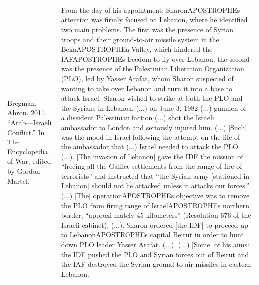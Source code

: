 {\begin{longtable}{p{}p{}}
\\
Bregman, Ahron. 2011. “Arab—Israeli Conflict.” In The Encyclopedia of War, edited by Gordon Martel. & From the day of his appointment, SharonAPOSTROPHEs attention was firmly focused on Lebanon, where he identified two main problems. The first was the presence of Syrian troops and their ground-to-air missile system in the BekaAPOSTROPHEa Valley, which hindered the IAFAPOSTROPHEs freedom to fly over Lebanon; the second was the presence of the Palestinian Liberation Organization (PLO), led by Yasser Arafat, whom Sharon suspected of wanting to take over Lebanon and turn it into a base to attack Israel. Sharon wished to strike at both the PLO and the Syrians in Lebanon. (...) on June 3, 1982 (...) gunmen of a dissident Palestinian faction (...) shot the Israeli ambassador to London and seriously injured him. (...) [Such] was the mood in Israel following the attempt on the life of the ambassador that (...) Israel needed to attack the PLO. (...).
[The invasion of Lebanon] gave the IDF the mission of “freeing all the Galilee settlements from the range of fire of terrorists” and instructed that “the Syrian army [stationed in Lebanon] should not be attacked unless it attacks our forces.” (...) [The] operationAPOSTROPHEs objective was to remove the PLO from firing range of IsraelAPOSTROPHEs northern border, “approxi-mately 45 kilometers” (Resolution 676 of the Israeli cabinet). (...). 
Sharon ordered [the IDF] to proceed up to LebanonAPOSTROPHEs capital Beirut in order to hunt down PLO leader Yasser Arafat. (...).
(...) [Some] of his aims: the IDF pushed the PLO and Syrian forces out of Beirut and the IAF destroyed the Syrian ground-to-air missiles in eastern Lebanon.
\\

\end{longtable}}
